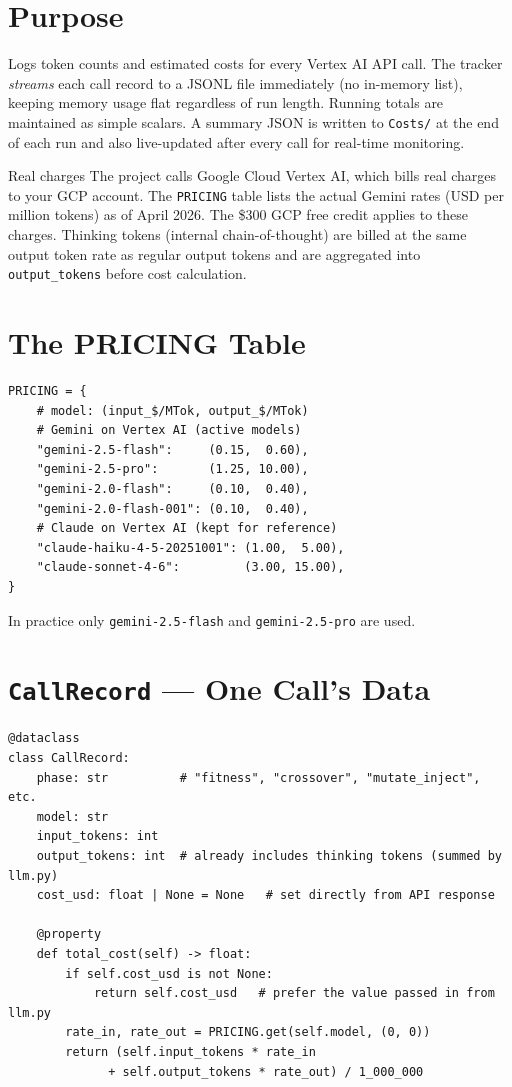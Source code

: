 \documentclass[11pt,a4paper]{report}
\newcommand{\fn}[1]{\texttt{#1}}
\begin{document}
\section{Purpose}

Logs token counts and estimated costs for every Vertex AI API call.  The tracker
\emph{streams} each call record to a JSONL file immediately (no in-memory list), keeping
memory usage flat regardless of run length.  Running totals are maintained as simple
scalars.  A summary JSON is written to \fn{Costs/} at the end of each run and also
live-updated after every call for real-time monitoring.

\begin{conceptbox}{Real charges}
The project calls Google Cloud Vertex AI, which bills real charges to your GCP account.
The \fn{PRICING} table lists the actual Gemini rates (USD per million tokens) as of
April 2026.  The \$300 GCP free credit applies to these charges.  Thinking tokens
(internal chain-of-thought) are billed at the same output token rate as regular output
tokens and are aggregated into \fn{output\_tokens} before cost calculation.
\end{conceptbox}

\section{The PRICING Table}

\begin{lstlisting}[style=example]
PRICING = {
    # model: (input_$/MTok, output_$/MTok)
    # Gemini on Vertex AI (active models)
    "gemini-2.5-flash":     (0.15,  0.60),
    "gemini-2.5-pro":       (1.25, 10.00),
    "gemini-2.0-flash":     (0.10,  0.40),
    "gemini-2.0-flash-001": (0.10,  0.40),
    # Claude on Vertex AI (kept for reference)
    "claude-haiku-4-5-20251001": (1.00,  5.00),
    "claude-sonnet-4-6":         (3.00, 15.00),
}
\end{lstlisting}

In practice only \fn{gemini-2.5-flash} and \fn{gemini-2.5-pro} are used.

\section{\fn{CallRecord} --- One Call's Data}

\begin{lstlisting}[style=example]
@dataclass
class CallRecord:
    phase: str          # "fitness", "crossover", "mutate_inject", etc.
    model: str
    input_tokens: int
    output_tokens: int  # already includes thinking tokens (summed by llm.py)
    cost_usd: float | None = None   # set directly from API response

    @property
    def total_cost(self) -> float:
        if self.cost_usd is not None:
            return self.cost_usd   # prefer the value passed in from llm.py
        rate_in, rate_out = PRICING.get(self.model, (0, 0))
        return (self.input_tokens * rate_in
              + self.output_tokens * rate_out) / 1_000_000
\end{lstlisting}
\end{document}
